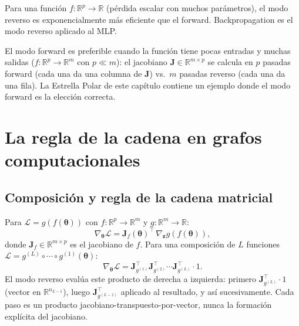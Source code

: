 Para una función $f: \mathbb{R}^p \to \mathbb{R}$ (pérdida escalar con
muchos parámetros), el modo reverso es exponencialmente más eficiente que
el forward. Backpropagation es el modo reverso aplicado al MLP.

El modo forward es preferible cuando la función tiene pocas entradas y
muchas salidas ($f: \mathbb{R}^p \to \mathbb{R}^m$ con $p \ll m$): el
jacobiano $\bm{J} \in \mathbb{R}^{m \times p}$ se calcula en $p$
pasadas forward (cada una da una columna de $\bm{J}$) vs.\ $m$ pasadas
reverso (cada una da una fila). La Estrella Polar de este capítulo
contiene un ejemplo donde el modo forward es la elección correcta.

\section{La regla de la cadena en grafos computacionales}
\label{sec:cadena_grafo}


\subsection{Composición y regla de la cadena matricial}
\label{subsec:cadena}

Para $\mathcal{L} = g(f(\bm{\theta}))$ con
$f: \mathbb{R}^p \to \mathbb{R}^m$ y $g: \mathbb{R}^m \to \mathbb{R}$:
\begin{equation}
  \nabla_{\bm{\theta}}\mathcal{L}
  = \bm{J}_f(\bm{\theta})^\top\,\nabla_{\bm{z}}g(f(\bm{\theta})),
  \label{eq:cadena}
\end{equation}
donde $\bm{J}_f \in \mathbb{R}^{m \times p}$ es el jacobiano de $f$.
Para una composición de $L$ funciones
$\mathcal{L} = g^{(L)} \circ \cdots \circ g^{(1)}(\bm{\theta})$:
\begin{equation}
  \nabla_{\bm{\theta}}\mathcal{L}
  = \bm{J}_{g^{(1)}}^\top \bm{J}_{g^{(2)}}^\top \cdots
  \bm{J}_{g^{(L)}}^\top \cdot 1.
  \label{eq:cadena_comp}
\end{equation}
El modo reverso evalúa este producto de derecha a izquierda: primero
$\bm{J}_{g^{(L)}}^\top \cdot 1$ (vector en $\mathbb{R}^{n_{L-1}}$),
luego $\bm{J}_{g^{(L-1)}}^\top$ aplicado al resultado, y así
sucesivamente. Cada paso es un producto jacobiano-transpuesto-por-vector,
nunca la formación explícita del jacobiano.

